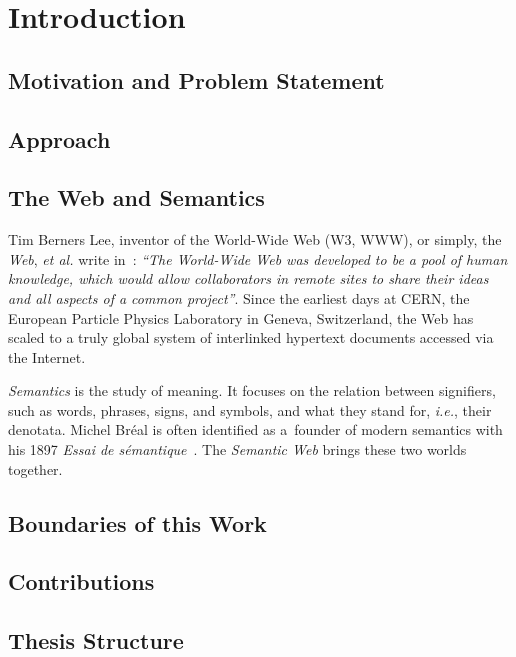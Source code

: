 

\chapter{Introduction}

\ifpdf
    \graphicspath{{1_introduction/figures/PNG/}{1_introduction/figures/PDF/}{1_introduction/figures/}}
\else
    \graphicspath{{1_introduction/figures/EPS/}{1_introduction/figures/}}
\fi


\section{Motivation and Problem Statement}

\section{Approach}

\section{The Web and Semantics}
Tim Berners Lee, inventor of the World-Wide Web (W3, WWW), or simply, the \emph{Web}, \emph{et al.}
write in~\cite{BernersLee1994}: \textit{``The World-Wide Web was developed
to be a pool of human knowledge, which would allow collaborators
in remote sites to share their ideas
and all aspects of a common project''}.
Since the earliest days at CERN,
the European Particle Physics Laboratory in Geneva, Switzerland,
the Web has scaled to a truly global system of interlinked hypertext documents
accessed via the Internet.

\emph{Semantics} is the study of meaning.
It focuses on the relation between signifiers, such as words, phrases, signs, and symbols,
and what they stand for, \emph{i.e.}, their denotata.
Michel Bréal is often identified as a~founder of modern semantics with his 1897
\emph{Essai de sémantique}~\cite{Breal1897}.
The \emph{Semantic Web} brings these two worlds together.

\section{Boundaries of this Work}

\section{Contributions}

\section{Thesis Structure}